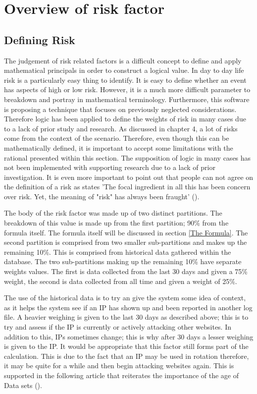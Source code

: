 \section{Overview of risk factor}
\subsection{Defining Risk} \label{Define Risk}
The judgement of risk related factors is a difficult concept to define and apply mathematical principals in order to construct a logical value. In day to day life risk is a particularly easy thing to identify. It is easy to define whether an event has aspects of high or low risk. However, it is a much more difficult parameter to breakdown and portray in mathematical terminology. Furthermore, this software is proposing a technique that focuses on previously neglected considerations. Therefore logic has been applied to define the weights of risk in many cases due to a lack of prior study and research. As discussed in chapter 4, a lot of risks come from the context of the scenario. Therefore, even though this can be mathematically defined, it is important to accept some limitations with the rational presented within this section. The supposition of logic in many cases has not been implemented with supporting research due to a lack of prior investigation. It is even more important to point out that people can not agree on the definition of a risk as \citeauthor{fischhoff1984defining} states 'The focal ingredient in all this has been concern over risk. Yet, the meaning of "risk" has always been fraught' (\cite{fischhoff1984defining}).


The body of the risk factor was made up of two distinct partitions. The breakdown of this value is made up from the first partition; 90\% from the formula itself. The formula itself will be discussed in section \ref{The Formula}. The second partition is comprised from two smaller sub-partitions and makes up the remaining 10\%. This is comprised from historical data gathered within the database. The two sub-partitions making up the remaining 10\%  have separate weights values. The first is data collected from the last 30 days and given a 75\% weight, the second is data collected from all time and given a weight of 25\%.

The use of the historical data is to try an give the system some idea of context, as it helps the system see if an IP has shown up and been reported in another log file. A heavier weighing is given to the last 30 days as described above; this is to try and assess if the IP is currently or actively attacking other websites. In addition to this, IPs sometimes change; this is why after 30 days a lesser weighing is given to the IP. It would be appropriate that this factor still forms part of the calculation. This is due to the fact that an IP may be used in rotation therefore, it may be quite for a while and then begin attacking websites again. This is supported in the following article that reiterates the importance of the age of Data sets (\cite{knowledge}).

